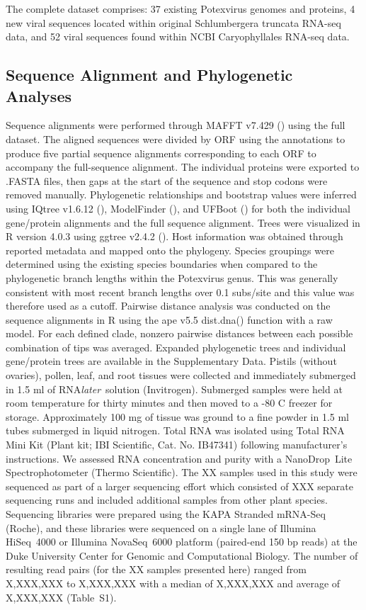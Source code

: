 \documentclass[11pt,letterpaper,titlepage]{article}
\begin{document}
\begin{linenumbers}
The complete dataset comprises: 37 existing Potexvirus genomes and proteins, 4 new viral sequences located within original Schlumbergera truncata RNA-seq data, and 52 viral sequences found within NCBI Caryophyllales RNA-seq data.

\subsection*{Sequence Alignment and Phylogenetic Analyses}
Sequence alignments were performed through MAFFT v7.429 (\cite{katoh_mafft_2002}) using the full dataset.
The aligned sequences were divided by ORF using the annotations to produce five partial sequence alignments corresponding to each ORF to accompany the full-sequence alignment. 
The individual proteins were exported to .FASTA files, then gaps at the start of the sequence and stop codons were removed manually. 
Phylogenetic relationships and bootstrap values were inferred using IQtree v1.6.12 (\cite{nguyen_iq-tree_2015}), ModelFinder (\cite{kalyaanamoorthy_modelfinder_2017}), and UFBoot (\cite{hoang_ufboot2_2018}) for both the individual gene/protein alignments and the full sequence alignment. 
Trees were visualized in R version 4.0.3 using ggtree v2.4.2 (\cite{yu_ggtree_2017}). 
Host information was obtained through reported metadata and mapped onto the phylogeny. 
Species groupings were determined using the existing species boundaries when compared to the phylogenetic branch lengths within the Potexvirus genus. 
This was generally consistent with most recent branch lengths over 0.1 subs/site and this value was therefore used as a cutoff. 
Pairwise distance analysis was conducted on the sequence alignments in R using the ape v5.5  dist.dna() function with a raw model. 
For each defined clade, nonzero pairwise distances between each possible combination of tips was averaged. 
Expanded phylogenetic trees and individual gene/protein trees are available in the Supplementary Data.
Pistils (without ovaries), pollen, leaf, and root tissues were collected and immediately submerged in 1.5 ml of RNA\textit{later}\texttrademark~solution (Invitrogen).
Submerged samples were held at room temperature for thirty minutes and then moved to a -80 C freezer for storage.
Approximately 100 mg of tissue was ground to a fine powder in 1.5 ml tubes submerged in liquid nitrogen.
Total RNA was isolated using Total RNA Mini Kit (Plant kit; IBI Scientific, Cat. No. IB47341) following manufacturer's instructions.
We assessed RNA concentration and purity with a NanoDrop\texttrademark~Lite Spectrophotometer (Thermo Scientific).
The XX samples used in this study were sequenced as part of a larger sequencing effort which consisted of XXX separate sequencing runs and included additional samples from other plant species.
Sequencing libraries were prepared using the KAPA Stranded mRNA-Seq (Roche), and these libraries were sequenced on a single lane of Illumina \mbox{HiSeq}~4000 or Illumina \mbox{NovaSeq}~6000 platform (paired-end 150 bp reads) at the Duke University Center for Genomic and Computational Biology.
The number of resulting read pairs (for the XX samples presented here) ranged from X,XXX,XXX to X,XXX,XXX with a median of X,XXX,XXX and average of X,XXX,XXX (Table~S1).



\end{linenumbers}
\end{document}
